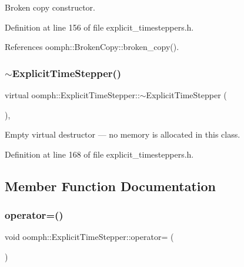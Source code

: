 Broken copy constructor. 



Definition at line 156 of file explicit\+\_\+timesteppers.\+h.



References oomph\+::\+Broken\+Copy\+::broken\+\_\+copy().

\mbox{\label{classoomph_1_1ExplicitTimeStepper_a51f659328a57063563b7344c8b9d7737}} 
\subsubsection{\texorpdfstring{$\sim$\+Explicit\+Time\+Stepper()}{~ExplicitTimeStepper()}}
{\footnotesize\ttfamily virtual oomph\+::\+Explicit\+Time\+Stepper\+::$\sim$\+Explicit\+Time\+Stepper (\begin{DoxyParamCaption}{ }\end{DoxyParamCaption})\hspace{0.3cm}{\ttfamily [inline]}, {\ttfamily [virtual]}}



Empty virtual destructor --- no memory is allocated in this class. 



Definition at line 168 of file explicit\+\_\+timesteppers.\+h.



\subsection{Member Function Documentation}
\mbox{\label{classoomph_1_1ExplicitTimeStepper_abed621c80844df126c29b8862092cb97}} 
\subsubsection{\texorpdfstring{operator=()}{operator=()}}
{\footnotesize\ttfamily void oomph\+::\+Explicit\+Time\+Stepper\+::operator= (\begin{DoxyParamCaption}\item[{const \hyperlink{classoomph_1_1ExplicitTimeStepper}{Explicit\+Time\+Stepper} \&}]{ }\end{DoxyParamCaption})\hspace{0.3cm}{\ttfamily [inline]}}



